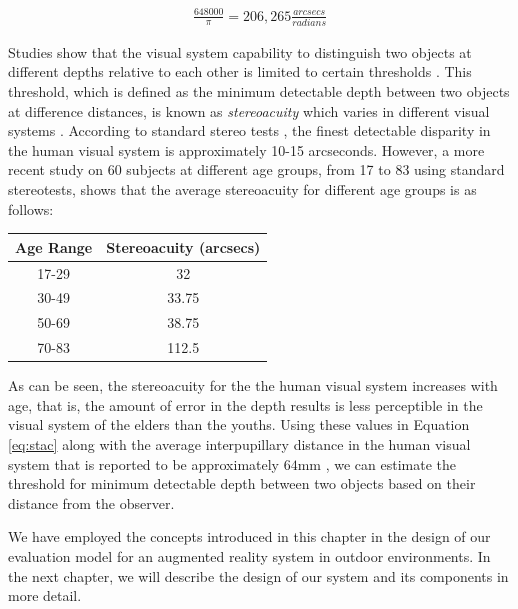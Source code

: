 \begin{align}
\frac {648000} {\pi} = 206,265 \frac{arcsecs}{radians}
\end{align}

Studies show that the visual system capability to distinguish two objects at different depths relative to each other is limited to certain thresholds \cite{binr83,how95}.
This threshold, which is defined as the minimum detectable depth between two 
objects at difference distances, is known as {\it stereoacuity} which varies in different visual systems \cite{binr83,how95}. According to standard
stereo tests \cite{binr83}, the finest detectable disparity in the human visual system is approximately 10-15 arcseconds.
However, a more recent study on 60 subjects \cite{garn06} at different age groups, from 17 to 83 using standard stereotests, 
shows that the average stereoacuity for different age groups is as follows:

\begin{minipage}{\linewidth}
\begin{center}
\label{tab:stAcAge}
\begin{tabular}{ |c|c| }
\hline
\textbf{Age Range} & \textbf{Stereoacuity (arcsecs)} \\ \hline
17-29 & 32 \\  \hline
30-49 & 33.75 \\ \hline
50-69 & 38.75 \\ \hline
70-83 & 112.5 \\ \hline
\end{tabular}
\end{center}
\end{minipage} \newline

As can be seen, the stereoacuity for the the human visual system increases with age, that is, 
the amount of error in the depth results 
is less perceptible in the visual system of the elders than the youths.
Using these values in Equation \ref{eq:stac} along with the average interpupillary distance in the human visual system 
that is reported to be approximately $64$mm \cite{how95}, 
we can estimate the threshold for minimum detectable depth
between two objects based on their distance from the observer.

We have employed the concepts introduced in this chapter in the design of our evaluation model for an augmented reality system 
in outdoor environments.
In the next chapter, we will describe the design of our system and its components in more detail.
